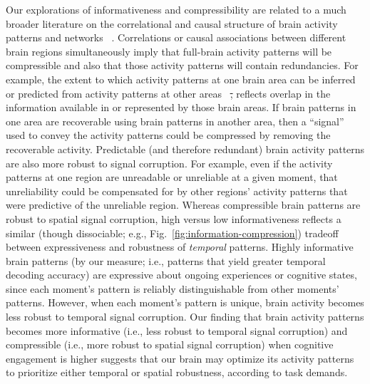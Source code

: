 \documentclass[english, 11pt]{article}
\providecommand{\DIFdeltex}[1]{{\protect\color{red}\sout{#1}}}                      %
\providecommand{\DIFaddbegin}{} %
\providecommand{\DIFaddend}{} %
\providecommand{\DIFdelbegin}{} %
\providecommand{\DIFdelend}{} %
\providecommand{\DIFdel}[1]{\texorpdfstring{\DIFdeltex{#1}}{}} %
\newcommand{\DIFscaledelfig}{0.5}
\newlength{\DIFdelgraphicswidth} %
\newlength{\DIFdelgraphicsheight} %
\newcommand{\DIFaddincludegraphics}[2][]{{\color{blue}\fbox{\DIFOincludegraphics[#1]{#2}}}} %
\newcommand{\DIFdelincludegraphics}[2][]{%
\sbox{\DIFdelgraphicsbox}{\DIFOincludegraphics[#1]{#2}}%
\settoboxwidth{\DIFdelgraphicswidth}{\DIFdelgraphicsbox} %
\settoboxtotalheight{\DIFdelgraphicsheight}{\DIFdelgraphicsbox} %
\scalebox{\DIFscaledelfig}{%
\parbox[b]{\DIFdelgraphicswidth}{\usebox{\DIFdelgraphicsbox}\\[-\baselineskip] \rule{\DIFdelgraphicswidth}{0em}}\llap{\resizebox{\DIFdelgraphicswidth}{\DIFdelgraphicsheight}{%
\setlength{\unitlength}{\DIFdelgraphicswidth}%
\begin{picture}(1,1)%
\thicklines\linethickness{2pt} %
{\color[rgb]{1,0,0}\put(0,0){\framebox(1,1){}}}%
{\color[rgb]{1,0,0}\put(0,0){\line( 1,1){1}}}%
{\color[rgb]{1,0,0}\put(0,1){\line(1,-1){1}}}%
\end{picture}%
}\hspace*{3pt}}} %
} %
\DeclareRobustCommand{\DIFaddbegin}{\DIFOaddbegin \let\includegraphics\DIFaddincludegraphics} %
\DeclareRobustCommand{\DIFaddend}{\DIFOaddend \let\includegraphics\DIFOincludegraphics} %
\DeclareRobustCommand{\DIFdelbegin}{\DIFOdelbegin \let\includegraphics\DIFdelincludegraphics} %
\DeclareRobustCommand{\DIFdelend}{\DIFOaddend \let\includegraphics\DIFOincludegraphics} %
\begin{document}
Our explorations of informativeness and compressibility are related to a much
broader literature on the correlational and causal structure of brain activity
patterns and networks~\DIFdelbegin %
\DIFdelend \DIFaddbegin \citep{PretEtal17, OwenEtal21, RogeEtal07, RubiSpor10,
SizeEtal18, SmitEtal13b, SmitEtal13c, SrinEtal07, TomaVolk11, YeoEtal11,
AdacEtal12, BassSpor17, BullSpor09, SporHone06, SporBetz16, SporZwi04,
DhamEtal08, KorzEtal08, BrovEtal04, LynnBass21, ShinEtal23}\DIFaddend . Correlations or causal
associations between different brain regions simultaneously imply that
full-brain activity patterns will be compressible and also that those activity
patterns will contain redundancies. For example, the extent to which activity
patterns at one brain area can be inferred or predicted from activity patterns
at other areas~\citep[e.g.,][]{OwenEtal20, ScanEtal21} \DIFdelbegin \DIFdel{, }\DIFdelend reflects overlap in the
information available in or represented by those brain areas. If brain patterns
in one area are recoverable using brain patterns in another area, then a
``signal'' used to convey the activity patterns could be compressed by removing
the recoverable activity. Predictable (and therefore redundant) brain activity
patterns are also more robust to signal corruption. For example, even if the
activity patterns at one region are unreadable or unreliable at a given moment,
that unreliability could be compensated for by other regions' activity patterns
that were predictive of the unreliable region. Whereas compressible brain
patterns are robust to spatial signal corruption, high versus low
informativeness reflects a similar (though dissociable; e.g.,
Fig.~\ref{fig:information-compression}) tradeoff between expressiveness and
robustness of \textit{temporal} patterns. Highly informative brain patterns (by
our measure; i.e., patterns that yield greater temporal decoding accuracy) are
expressive about ongoing experiences or cognitive states, since each moment's
pattern is reliably distinguishable from other moments' patterns. However, when
each moment's pattern is unique, brain activity becomes less robust to temporal
signal corruption. Our finding that brain activity patterns becomes more
informative (i.e., less robust to temporal signal corruption) and compressible
(i.e., more robust to spatial signal corruption) when cognitive engagement is
higher suggests that our brain may optimize its activity patterns to prioritize
either temporal or spatial robustness, according to task demands.
\end{document}
